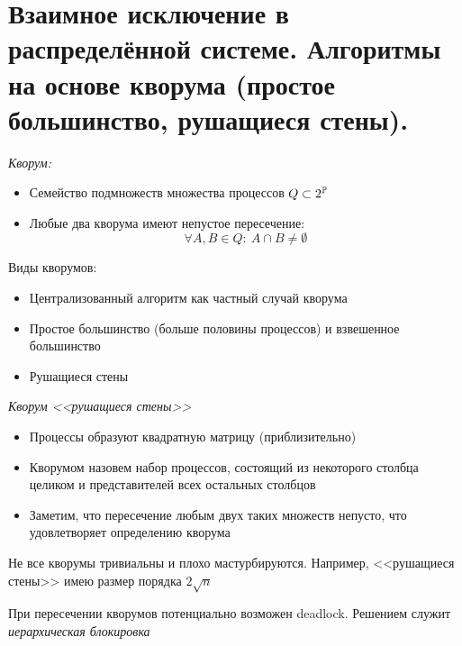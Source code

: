 \section{Взаимное исключение в распределённой системе. Алгоритмы на основе кворума (простое большинство, рушащиеся стены).}

\begin{definition} \textit{Кворум:}
    \begin{itemize}
        \item Семейство подмножеств множества процессов $Q \subset 2^{\mathbb{P}}$
        \item Любые два кворума имеют непустое пересечение:
            \[
                \forall A, B \in Q\colon~ A \cap B \neq \emptyset
            \]
    \end{itemize}
\end{definition}

\begin{examples} Виды кворумов:
    \begin{itemize}
        \item Централизованный алгоритм как частный случай кворума
        \item Простое большинство (больше половины процессов) и взвешенное большинство
        \item Рушащиеся стены
    \end{itemize}
\end{examples}

\begin{definition} \textit{Кворум <<рушащиеся стены>>}
    \begin{itemize}
        \item Процессы образуют квадратную матрицу (приблизительно)
        \item Кворумом назовем набор процессов, состоящий из некоторого столбца целиком и представителей всех остальных столбцов
        \item Заметим, что пересечение любым двух таких множеств непусто, что удовлетворяет определению кворума
    \end{itemize}
\end{definition}

\begin{remark}
    Не все кворумы тривиальны и плохо мастурбируются. Например, <<рушащиеся стены>> имею размер порядка $2\sqrt{n}$
\end{remark}

\begin{remark}
    При пересечении кворумов потенциально возможен deadlock. Решением служит \textit{иерархическая блокировка}
\end{remark}